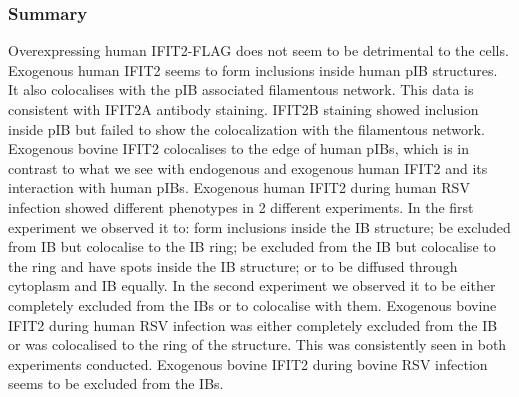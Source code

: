 \subsubsection{Summary} \label{Summary}
Overexpressing human IFIT2-FLAG does not seem to be detrimental to the cells. Exogenous human IFIT2 seems to form inclusions inside human pIB structures. It also colocalises with the pIB associated filamentous network. This data is consistent with IFIT2A antibody staining. IFIT2B staining showed inclusion inside pIB but failed to show the colocalization with the filamentous network. Exogenous bovine IFIT2 colocalises to the edge of human pIBs, which is in contrast to what we see with endogenous and exogenous human IFIT2 and its interaction with human pIBs. Exogenous human IFIT2 during human RSV infection showed different phenotypes in 2 different experiments. In the first experiment we observed it to: form inclusions inside the IB structure; be excluded from IB but colocalise to the IB ring; be excluded from the IB but colocalise to the ring and have spots inside the IB structure; or to be diffused through cytoplasm and IB equally. In the second experiment we observed it to be either completely excluded from the IBs or to colocalise with them. Exogenous bovine IFIT2 during human RSV infection was either completely excluded from the IB or was colocalised to the ring of the structure. This was consistently seen in both experiments conducted. Exogenous bovine IFIT2 during bovine RSV infection seems to be excluded from the IBs.